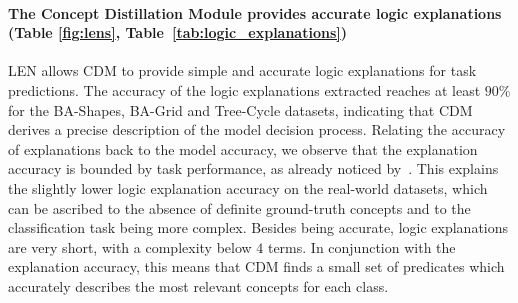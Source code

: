 

\paragraph{The Concept Distillation Module provides accurate logic explanations (Table \ref{fig:lens}, Table~\ref{tab:logic_explanations})}
LEN allows CDM to provide simple and accurate logic explanations for task predictions. The accuracy of the logic explanations extracted reaches at least $90\%$ for the BA-Shapes, BA-Grid and Tree-Cycle datasets, indicating that CDM derives a precise description of the model decision process. Relating the accuracy of explanations back to the model accuracy, we observe that the explanation accuracy is bounded by task performance, as already noticed by~\citet{ciravegna2021logic}. This explains the slightly lower logic explanation accuracy on the real-world datasets, which can be ascribed to the absence of definite ground-truth concepts and to the classification task being more complex. Besides being accurate, logic explanations are very short, with a complexity below $4$ terms. In conjunction with the explanation accuracy, this means that CDM finds a small set of predicates which accurately describes the most relevant concepts for each class. %

